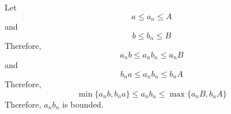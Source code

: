 \documentclass[fleqn, a4paper, 12pt, oneside]{amsart}
\theoremstyle{definition}
\theoremstyle{theorem}
\begin{document}
\begin{solution}
	Let
	\begin{equation*}
		a \le a_n \le A
	\end{equation*}
	and
	\begin{equation*}
		b \le b_n \le B
	\end{equation*}
	Therefore,
	\begin{equation*}
		a_n b \le a_n b_n \le a_n B
	\end{equation*}
	and 
	\begin{equation*}
		b_n a \le a_n b_n \le b_n A
	\end{equation*}
	Therefore, 
	\begin{equation*}
		\min \{a_n b, b_n a\} \le a_n b_n \le \max \{a_n B, b_n A\}
	\end{equation*}
	Therefore, $a_n b_n$ is bounded.
\end{solution}

%
%	
\end{document}
